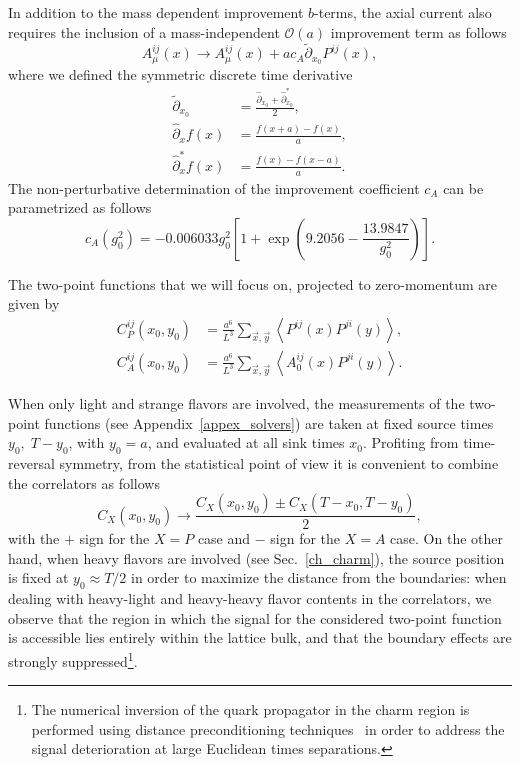 In addition to the mass dependent improvement $b$-terms, the axial current also requires the inclusion of a mass-independent $\mathcal{O}(a)$ improvement term as follows
\begin{equation}
\label{ch_observables:eq:axial_impr}
A_{\mu}^{ij}(x)\rightarrow A_{\mu}^{ij}(x)+ac_A\tilde{\partial}_{x_0}P^{ij}(x),
\end{equation}
where we defined the symmetric discrete time derivative
\begin{align}
\tilde{\partial}_{x_0}&=\frac{\hat{\partial}_{x_0}+\hat{\partial}_{x_0}^*}{2},\\
\hat{\partial}_{x}f(x)&=\frac{f(x+a)-f(x)}{a},\\
\hat{\partial}^*_{x}f(x)&=\frac{f(x)-f(x-a)}{a}.
\end{align}
The non-perturbative determination of the improvement coefficient $c_A$ can be parametrized as follows ~\citep{Bulava:2015bxa}
\begin{equation}
c_A(g_0^2)=-0.006033g_0^2\left[1+\exp\left(9.2056-\frac{13.9847}{g_0^2}\right)\right].
\end{equation}

The two-point functions that we will focus on, projected to zero-momentum are given by
\begin{align}
\label{ch_observables:eq:corrs}
C_P^{ij}(x_0,y_0)&=\frac{a^6}{L^3}\sum_{\vec{x},\vec{y}}\left<P^{ij}(x)P^{ji}(y)\right>,\\
C_A^{ij}(x_0,y_0)&=\frac{a^6}{L^3}\sum_{\vec{x},\vec{y}}\left<A_0^{ij}(x)P^{ji}(y)\right>.
\end{align}

When only light and strange flavors are involved, the measurements of the two-point functions (see Appendix~\ref{appex_solvers}) are taken at fixed source times $y_0,\;T-y_0$, with $y_0=a$, and evaluated at all sink times $x_0$. Profiting from time-reversal symmetry, from the statistical point of view it is convenient to combine the correlators as follows
\begin{equation}
C_X(x_0,y_0)\to\frac{C_X(x_0,y_0)\pm C_X(T-x_0,T-y_0)}{2},
\end{equation}
with the $+$ sign for the $X=P$ case and $-$ sign for the $X=A$ case. On the other hand, when heavy flavors are involved (see Sec.~\ref{ch_charm}), the source position is fixed at $y_0\approx T/2$ in order to maximize the distance from the boundaries: when dealing with heavy-light and heavy-heavy flavor contents in the correlators, we observe that the region in which the signal for the considered two-point function is accessible lies entirely within the lattice bulk, and that the boundary effects are strongly suppressed\footnote{The numerical inversion of the quark propagator in the charm region is performed using distance preconditioning techniques~\cite{deDivitiis:2010ya,Collins:2017iud} in order to address  the signal deterioration at large Euclidean times separations.}.

